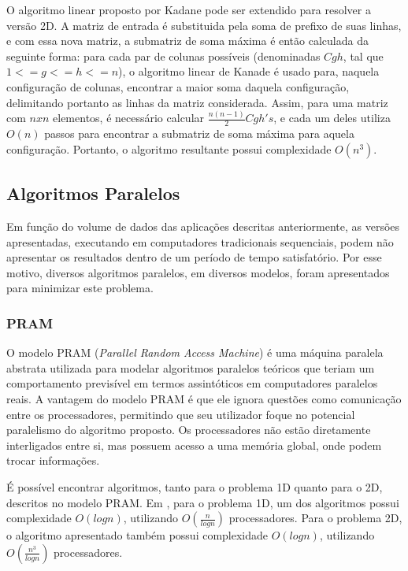 \documentclass[a4paper, 12pt] {article}
\begin{document}
O algoritmo linear proposto por Kadane pode ser extendido para resolver a versão
2D. A matriz de entrada é substituida pela soma de prefixo de suas linhas, e com
essa nova matriz, a submatriz de soma máxima é então calculada da seguinte
forma: para cada par de colunas possíveis (denominadas $Cgh$, tal que $1 <= g
<= h <= n$), o algoritmo linear de Kanade é usado para, naquela configuração de
colunas, encontrar a maior soma daquela configuração, delimitando portanto as linhas da matriz considerada. Assim, para
uma matriz com $nxn$ elementos, é necessário calcular $\frac{n(n-1)}{2} Cgh's$,
e cada um deles utiliza $O(n)$ passos para encontrar a submatriz de soma máxima
para aquela configuração. Portanto, o algoritmo resultante possui complexidade
$O(n^3)$.

\subsection{Algoritmos Paralelos}

Em função do volume de dados das aplicações descritas anteriormente, as
versões apresentadas, executando em computadores tradicionais sequenciais, podem
não apresentar os resultados dentro de um período de tempo satisfatório. Por
esse motivo, diversos algoritmos paralelos, em diversos modelos, foram
apresentados para minimizar este problema.

\subsubsection{PRAM}

O modelo PRAM (\textit{Parallel Random Access Machine}) é uma máquina paralela
abstrata utilizada para modelar algoritmos paralelos teóricos que teriam um
comportamento previsível em termos assintóticos em computadores paralelos reais.
A vantagem do modelo PRAM é que ele ignora questões como comunicação entre os
processadores, permitindo que seu utilizador foque no potencial paralelismo do
algoritmo proposto. Os processadores não estão diretamente interligados entre
si, mas possuem acesso a uma memória global, onde podem trocar informações.

É possível encontrar algoritmos, tanto para o problema 1D quanto para o 2D,
descritos no modelo PRAM. Em \cite{journals/ppl/PerumallaD95}, para o problema
1D, um dos algoritmos  possui complexidade $O(log n)$, utilizando $O(\frac{n}{log
n})$ processadores. Para o problema 2D, o algoritmo apresentado também possui
complexidade $O(log n)$, utilizando $O(\frac{n^3}{log
n})$ processadores.
\end{document}
